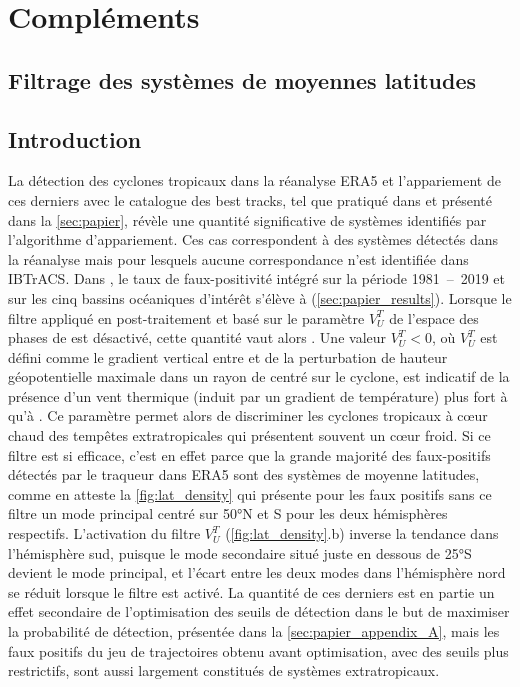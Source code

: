 \documentclass[../main.tex]{subfiles}
\begin{document}
\section{Compléments}\label{sec:complements_papier}

\subsection{Filtrage des systèmes de moyennes latitudes}\label{sec:filtrage_mid_latitudes}

\subsection*{Introduction}

La détection des cyclones tropicaux dans la réanalyse ERA5 et l'appariement de ces derniers avec le catalogue des best tracks, tel que pratiqué dans
\cite{dulac_assessing_2023} et présenté dans la \cref{sec:papier}, révèle une quantité significative de systèmes identifiés  par
l'algorithme d'appariement. Ces cas correspondent à des systèmes détectés dans la réanalyse mais pour lesquels aucune correspondance n'est identifiée dans
IBTrACS. Dans \cite{dulac_assessing_2023}, le taux de faux-positivité intégré sur la période \num{1981}~--~\num{2019} et sur les cinq bassins océaniques
d'intérêt s'élève à  (\cref{sec:papier_results}). Lorsque le filtre appliqué en post-traitement et basé sur le paramètre $V_U^T$ de l'espace des phases
de \cite{hart_cyclone_2003} est désactivé, cette quantité vaut alors . Une valeur $V_U^T < 0$, où $V_U^T$ est défini comme le gradient vertical entre
 et  de la perturbation de hauteur géopotentielle maximale dans un rayon de  centré sur le cyclone, est indicatif de la présence d'un
vent thermique (induit par un gradient de température) plus fort à  qu'à . Ce paramètre permet alors de discriminer les cyclones tropicaux à
cœur chaud des tempêtes extratropicales qui présentent souvent un cœur froid. Si ce filtre est si efficace, c'est en effet parce que la grande majorité des
faux-positifs détectés par le traqueur dans ERA5 sont des systèmes de moyenne latitudes, comme en atteste la \cref{fig:lat_density} qui présente pour les faux
positifs sans ce filtre un mode principal centré sur \ang{50}N et S pour les deux hémisphères respectifs. L'activation du filtre $V_U^T$
(\cref{fig:lat_density}.b) inverse la tendance dans l'hémisphère sud, puisque le mode secondaire situé juste en dessous de \ang{25}S devient le mode principal,
et l'écart entre les deux modes dans l'hémisphère nord se réduit lorsque le filtre est activé. La quantité de ces derniers est en partie un effet secondaire de
l'optimisation des seuils de détection dans le but de maximiser la probabilité de détection, présentée dans la \cref{sec:papier_appendix_A}, mais les faux
positifs du jeu de trajectoires obtenu avant optimisation, avec des seuils plus restrictifs, sont aussi largement constitués de systèmes extratropicaux.
\end{document}
